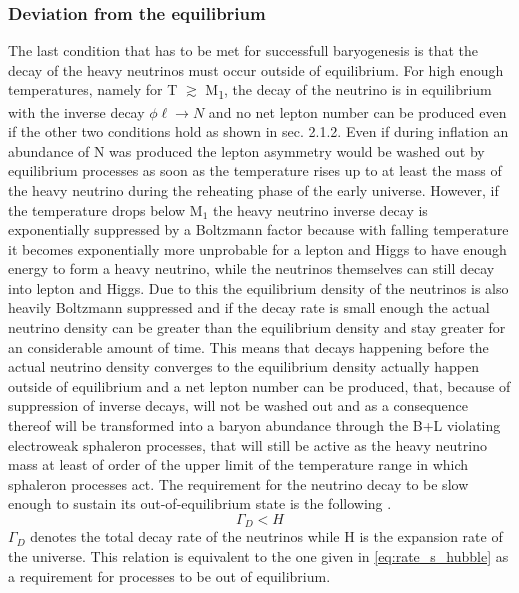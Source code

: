 \subsubsection{Deviation from the equilibrium}
The last condition that has to be met for successfull baryogenesis is that the decay of the heavy neutrinos must occur outside of equilibrium. For high enough temperatures, namely for T $\gtrsim$ M\textsubscript{1}, the decay of the neutrino is in equilibrium with the inverse decay $\phi\ell\rightarrow N$ and no net lepton number can be produced even if the other two conditions hold as shown in sec. 2.1.2. Even if during inflation an abundance of N was produced the lepton asymmetry would be washed out by equilibrium processes as soon as the temperature rises up to at least the mass of the heavy neutrino during the reheating phase of the early universe. \newline
However, if the temperature drops below M$_1$ the heavy neutrino inverse decay is exponentially suppressed by a Boltzmann factor because with falling temperature it becomes exponentially more unprobable for a lepton and Higgs to have enough energy to form a heavy neutrino, while the neutrinos themselves can still decay into lepton and Higgs. Due to this the equilibrium density of the neutrinos is also heavily Boltzmann suppressed and if the decay rate is small enough the actual neutrino density can be greater than the equilibrium density and stay greater for an considerable amount of time. This means that decays happening before the actual neutrino density converges to the equilibrium density actually happen outside of equilibrium and a net lepton number can be produced, that, because of suppression of inverse decays, will not be washed out and as a consequence thereof will be transformed into a baryon abundance through the B+L violating electroweak sphaleron processes, that will still be active as the heavy neutrino mass at least of order of the upper limit of the temperature range in which sphaleron processes act. \newline
The requirement for the neutrino decay to be slow enough to sustain its out-of-equilibrium state is the following \cite[p. 30]{Taanila:2008}.
\begin{equation}
	\Gamma_D<H
	\label{eq:out_of_eq}
\end{equation}
$\Gamma_D$ denotes the total decay rate of the neutrinos while H is the expansion rate of the universe. This relation is equivalent to the one given in \ref{eq:rate_s_hubble} as a requirement for processes to be out of equilibrium. 